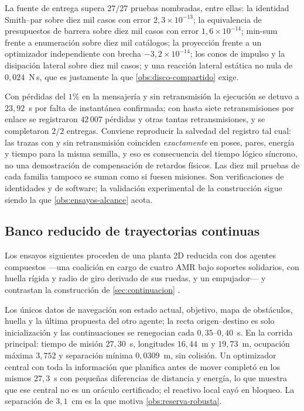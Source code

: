 \begin{observacion}
\label{obs:pruebas-software}
La fuente de entrega supera $27/27$ pruebas nombradas, entre ellas: la
identidad Smith–par sobre diez mil casos con error $2{,}3\times10^{-13}$; la
equivalencia de presupuestos de barrera sobre diez mil casos con error
$1{,}6\times10^{-14}$; min-sum frente a enumeración sobre diez mil catálogos;
la proyección frente a un optimizador independiente con brecha
$-3{,}2\times10^{-14}$; los conos de impulso y la disipación lateral sobre diez
mil casos; y una reacción lateral estática no nula de $0{,}024$~N\,s, que es
justamente la que \cref{obs:disco-compartido} exige.

Con pérdidas del $1\%$ en la mensajería y sin retransmisión la ejecución se
detuvo a $23{,}92$~s por falta de instantánea confirmada; con hasta siete
retransmisiones por enlace se registraron $42\,007$ pérdidas y otras tantas
retransmisiones, y se completaron $2/2$ entregas. Conviene reproducir la
salvedad del registro tal cual: las trazas con y sin retransmisión coinciden
\emph{exactamente} en poses, pares, energía y tiempo para la misma semilla, y
eso es consecuencia del tiempo lógico síncrono, no una demostración de
compensación de retardos físicos. Las diez mil pruebas de cada familia tampoco
se suman como si fuesen misiones. Son verificaciones de identidades y de
software; la validación experimental de la construcción sigue siendo la que
\cref{obs:ensayos-alcance} acota.
\end{observacion}

\subsection{Banco reducido de trayectorias continuas}

Los ensayos siguientes proceden de una planta 2D reducida con dos agentes
compuestos —una coalición en \textsf{cargo} de cuatro AMR bajo soportes
solidarios, con huella rígida y radio de giro derivado de sus ruedas, y un
empujador— y contrastan la construcción de \cref{sec:continuacion}
\cite{mayorga2026compendio}.

\begin{observacion}
\label{obs:ensayo-r6}
Los únicos datos de navegación son estado actual, objetivo, mapa de
obstáculos, huella y la última propuesta del otro agente; la recta
origen--destino es solo inicialización y las continuaciones se renegocian cada
$0{,}35$--$0{,}40$~s. En la corrida principal: tiempo de misión $27{,}30$~s,
longitudes $16{,}44$~m y $19{,}73$~m, ocupación máxima $3{,}752$ y separación
mínima $0{,}0309$~m, sin colisión. Un optimizador central con toda la
información que planifica antes de mover completó en los mismos $27{,}3$~s con
pequeñas diferencias de distancia y energía, lo que muestra que ese central
no es un oráculo certificado; el reactivo local cayó en bloqueo. La separación
de $3{,}1$~cm es la que motiva \cref{obs:reserva-robusta}.
\end{observacion}

